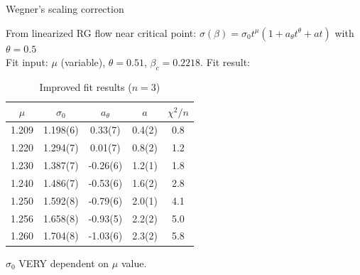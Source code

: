\documentclass[12pt,handout]{beamer}
\begin{document}
\begin{frame}{Wegner's scaling correction}
\begin{center}
From linearized RG flow near critical point:
$ \sigma\left( \beta \right) = \sigma _0 t^{\mu}\left( 1 + a_\theta t^{\theta} + a t\right)
$ with $\theta = 0.5$\\
\vspace{5pt}
Fit input: $\mu$ (variable), $\theta = 0.51$, $\beta_c = 0.2218$.
Fit result:
\begin{table}[!htb]
\centering
\begin{tabular}{|c|c|c|c|c|}
\hline
$\mu$ & $\sigma_0$ & $a_{\theta}$ & $a$ & $\chi^2/n$ \\
\hline
1.209 & 1.198(6) & 0.33(7) & 0.4(2) & 0.8\\
\hline
1.220 & 1.294(7) & 0.01(7) & 0.8(2) & 1.2\\
\hline
1.230 & 1.387(7) & -0.26(6) & 1.2(1) & 1.8\\
\hline
1.240 & 1.486(7) & -0.53(6) & 1.6(2) & 2.8\\
\hline
1.250 & 1.592(8) & -0.79(6) & 2.0(1) & 4.1\\
\hline
1.256 & 1.658(8) & -0.93(5) & 2.2(2) & 5.0\\
\hline
1.260 & 1.704(8) & -1.03(6) & 2.3(2) & 5.8\\
\hline

\end{tabular}
\caption{Improved fit results ($n=3$)\label{tab:fitfinalimproved}}
\end{table}
$\sigma_0$ VERY dependent on  $\mu$ value.
\end{center}
\end{frame}
\end{document}
